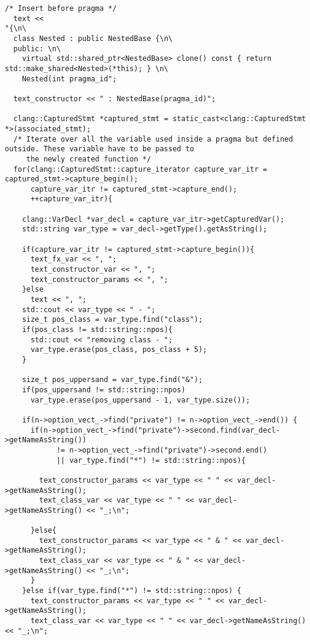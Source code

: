 \documentclass[a4paper,11pt,twoside]{book}
\begin{document}
\begin{lstlisting}[language=CCC, caption=driver/program.cpp]
/* Insert before pragma */
  text <<
"{\n\
  class Nested : public NestedBase {\n\
  public: \n\
    virtual std::shared_ptr<NestedBase> clone() const { return std::make_shared<Nested>(*this); } \n\
    Nested(int pragma_id";

  text_constructor << " : NestedBase(pragma_id)";

  clang::CapturedStmt *captured_stmt = static_cast<clang::CapturedStmt *>(associated_stmt);
  /* Iterate over all the variable used inside a pragma but defined outside. These variable have to be passed to
     the newly created function */ 
  for(clang::CapturedStmt::capture_iterator capture_var_itr = captured_stmt->capture_begin(); 
      capture_var_itr != captured_stmt->capture_end(); 
      ++capture_var_itr){

    clang::VarDecl *var_decl = capture_var_itr->getCapturedVar(); 
    std::string var_type = var_decl->getType().getAsString();

    if(capture_var_itr != captured_stmt->capture_begin()){
      text_fx_var << ", ";
      text_constructor_var << ", ";
      text_constructor_params << ", ";
    }else
      text << ", ";
    std::cout << var_type << " - ";
    size_t pos_class = var_type.find("class");
    if(pos_class != std::string::npos){
      std::cout << "removing class - ";
      var_type.erase(pos_class, pos_class + 5);
    }
    
    size_t pos_uppersand = var_type.find("&");
    if(pos_uppersand != std::string::npos)
      var_type.erase(pos_uppersand - 1, var_type.size());

    if(n->option_vect_->find("private") != n->option_vect_->end()) {
      if(n->option_vect_->find("private")->second.find(var_decl->getNameAsString()) 
            != n->option_vect_->find("private")->second.end() 
            || var_type.find("*") != std::string::npos){

        text_constructor_params << var_type << " " << var_decl->getNameAsString();
        text_class_var << var_type << " " << var_decl->getNameAsString() << "_;\n";

      }else{
        text_constructor_params << var_type << " & " << var_decl->getNameAsString();
        text_class_var << var_type << " & " << var_decl->getNameAsString() << "_;\n";
      }
    }else if(var_type.find("*") != std::string::npos) {
      text_constructor_params << var_type << " " << var_decl->getNameAsString();
      text_class_var << var_type << " " << var_decl->getNameAsString() << "_;\n";


\end{lstlisting}
\end{document}
